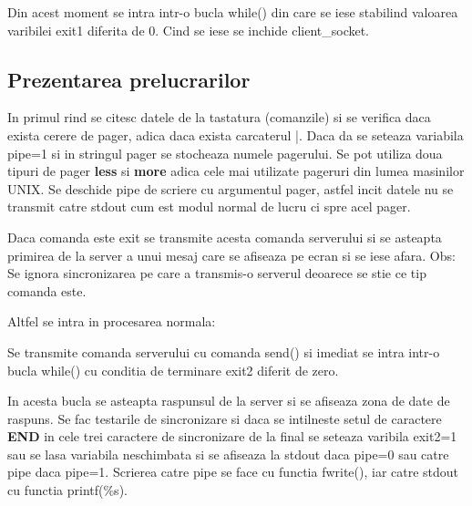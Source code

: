 \documentclass{report}
\begin{document}
Din acest moment se intra intr-o bucla while() din care se iese stabilind
valoarea varibilei exit1 diferita de 0. Cind se iese se inchide
client\_socket.

\subsection{Prezentarea prelucrarilor}

\hspace{5mm}In primul rind se citesc datele de la tastatura (comanzile) si
se verifica daca exista cerere de pager, adica daca exista carcaterul |.
Daca da se seteaza variabila pipe=1 si in stringul pager se stocheaza numele
pagerului. Se pot utiliza doua tipuri de pager \textbf{less} si \textbf{more}
adica cele mai utilizate pageruri din lumea masinilor UNIX. Se deschide pipe
de scriere cu argumentul pager, astfel incit datele nu se transmit catre
stdout cum est modul normal de lucru ci spre acel pager.

Daca comanda este exit se transmite acesta comanda serverului si se asteapta
primirea de la server a unui mesaj care se afiseaza pe ecran si se iese
afara. Obs: Se ignora sincronizarea pe care a transmis-o serverul deoarece
se stie ce tip comanda este.

Altfel se intra in procesarea normala:

Se transmite comanda serverului cu comanda send() si imediat se intra intr-o
bucla while() cu conditia de terminare exit2 diferit de zero.

In acesta bucla se asteapta raspunsul de la server si se afiseaza zona de
date de raspuns. Se fac testarile de sincronizare si daca se intilneste
setul de caractere \textbf{END} in cele trei caractere de sincronizare de la
final se seteaza varibila exit2=1 sau se lasa variabila neschimbata si se
afiseaza la stdout daca pipe=0 sau catre pipe daca pipe=1. Scrierea catre
pipe se face cu functia fwrite(), iar catre stdout cu functia printf(\%s).
\end{document}
